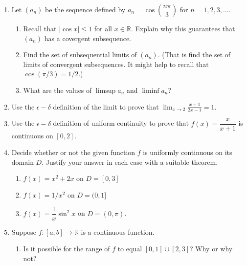 \documentclass[12pt]{article}
\newcommand{\points}[1]{\marginpar{\hspace{24pt}[#1]}}
\newcommand{\R}{\mathbb{R}}
\newcommand{\abs}[1]{\lvert #1\rvert}
\begin{document}
\begin{enumerate}
\item Let $(a_n)$ be the sequence defined by $a_n = \cos\left(\dfrac{n\pi}{3}\right)$ for $n=1,2,3,\ldots$.
\begin{enumerate}
 \item Recall that $\abs{\cos x}\leq 1$ for all $x\in\R$. Explain why this guarantees that $(a_n)$ has a covergent subsequence.\points{2}

\vspace{2in}

 \item Find the set of subsequential limits of $(a_n)$. (That is find the set of limits of convergent subsequences. It might help to recall that $\cos(\pi/3)=1/2$.) \points{4}

\vspace{3in}

 \item What are the values of $\limsup a_n$ and $\liminf a_n$?\points{2}
\end{enumerate}
\newpage

\item Use the $\epsilon-\delta$ definition of the limit to prove that $\displaystyle \lim_{x\to 2}\frac{x+1}{2x-1}=1$. \points{5}

\vspace{4.5in}

\item Use the $\epsilon-\delta$ definition of uniform continuity to prove that $f(x) = \dfrac{x}{x+1}$ is continuous on $[0,2]$.\points{5}
\newpage
\item Decide whether or not the given function $f$ is uniformly continuous on its domain $D$. Justify your answer in each case with a suitable theorem.
\begin{enumerate}
 \item $f(x)=x^2+2x$ on $D=[0,3]$\points{2}

\vspace{1in}


 \item $f(x)=1/x^2$ on $D=(0,1]$\points{2}

\vspace{1in}

 \item $f(x)=\dfrac{1}{x}\sin^2x$ on $D=(0,\pi)$.\points{2}

\vspace{1.5in}

\end{enumerate}
\item Suppose $f:[a,b]\to \R$ is a continuous function.
\begin{enumerate}
 \item Is it possible for the range of $f$ to equal $[0,1]\cup [2,3]$? Why or why not? \points{2}


\end{enumerate}
\end{enumerate}
\end{document}
